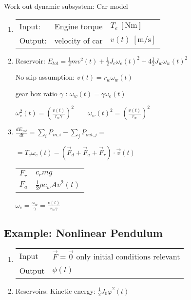 \documentclass[10pt,a4paper]{scrartcl}
\begin{document}
\begin{multicols*}{3}

Work out dynamic subsystem: Car model
\begin{enumerate}
\item \begin{tabular}{lll}Input: & Engine torque & $T_e\ [\si{\newton\meter}]$\\
Output: & velocity of car & $v(t)\ [\si{\meter\per\second}]$ \end{tabular}
\item Reservoir: $E_{tot}=\frac{1}{2}mv^2(t)+\frac{1}{2}J_e\omega_e(t)^2+4\frac{1}{2}J_w\omega_w(t)^2$

No slip assumption: $v(t)=r_w\omega_w(t)$

gear box ratio $\gamma$ : $\omega_w(t)=\gamma\omega_e(t)$

$\omega_e^2(t)=\left(\frac{v(t)}{r_w\gamma}\right)^2\qquad \omega_w(t)^2=\left(\frac{v(t)}{r_w}\right)^2$


\item $\frac{dE_{Tot}}{dt}=\sum\limits_iP_{in,i}-\sum\limits_jP_{out,j}=$

$=T_e\omega_e(t)-\left(\vec{F}_d+\vec{F}_a+\vec{F}_r\right)\cdot \vec{v}(t)$

\begin{tabular}{l@{ = }l}
$F_r$&$c_rmg$\\
$F_a$&$\frac{1}{2}\rho c_w A v^2(t)$
\end{tabular}\hfill $\omega_e=\frac{\omega_w}{\gamma}=\frac{v(t)}{r_w\gamma}$


\end{enumerate}



\columnbreak

\subsection{Example: Nonlinear Pendulum}


\begin{enumerate}
\item \begin{tabular}{ll}Input & $\vec{F}=\vec{0}$ only initial conditions relevant\\Output & $\phi(t)$ \end{tabular}
\item Reservoirs: Kinetic energy: $\frac{1}{2}J_0\dot{\varphi}^2(t)$


\end{enumerate}
\end{multicols*}
\end{document}
